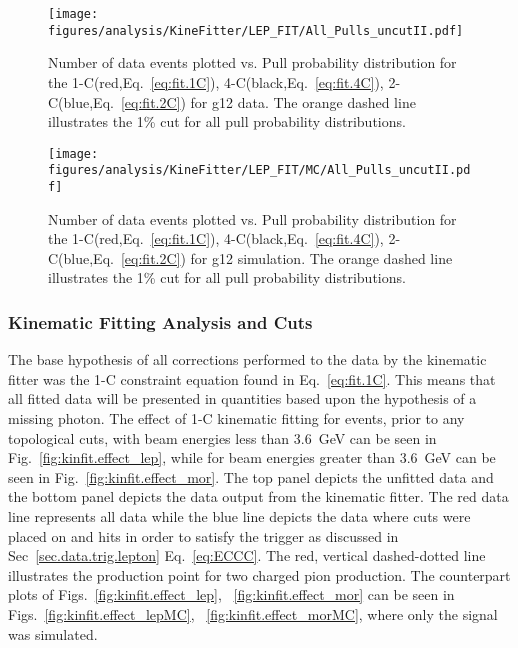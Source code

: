 \begin{figure}[h!]\begin{center}
\texttt{[image: \\figures/analysis/KineFitter/LEP\_FIT/All\_Pulls\_uncutII.pdf]}
\caption[Number of data events plotted vs. Pull distribution for the 1-C(red), 4-C(black), 2-C(blue) for g12 data]{\label{fig:kinfit.analysispulls}Number of data events plotted vs. Pull probability distribution for the 1-C(red,Eq.~\ref{eq:fit.1C}), 4-C(black,Eq.~\ref{eq:fit.4C}), 2-C(blue,Eq.~\ref{eq:fit.2C}) for g12 data. The orange dashed line illustrates the 1\% cut for all pull probability distributions.}
\end{center}\end{figure}

\begin{figure}[h!]\begin{center}
\texttt{[image: \\figures/analysis/KineFitter/LEP\_FIT/MC/All\_Pulls\_uncutII.pdf]}
\caption[Number of data events plotted vs. Pull distribution for the 1-C(red), 4-C(black), 2-C(blue) for g12 simulation]{\label{fig:kinfit.analysispulls_MC}Number of data events plotted vs. Pull probability distribution for the 1-C(red,Eq.~\ref{eq:fit.1C}), 4-C(black,Eq.~\ref{eq:fit.4C}), 2-C(blue,Eq.~\ref{eq:fit.2C}) for g12 simulation. The orange dashed line illustrates the 1\% cut for all pull probability distributions.}
\end{center}\end{figure}
\FloatBarrier
%
%
%
\subsubsection{Kinematic Fitting Analysis and Cuts}\label{sec:analysis.fitting.compare}

The base hypothesis of all corrections performed to the data by the kinematic fitter was the 1-C constraint equation found in Eq.~\ref{eq:fit.1C}. This means that all fitted data will be presented in quantities based upon the hypothesis of a missing photon. The effect of 1-C kinematic fitting for events, prior to any topological cuts, with beam energies less than 3.6~GeV can be seen in Fig.~\ref{fig:kinfit.effect_lep}, while for beam energies greater than 3.6~GeV can be seen in Fig.~\ref{fig:kinfit.effect_mor}. The top panel depicts the unfitted data and the bottom panel depicts the data output from the kinematic fitter. The red data line represents all data while the blue line depicts the data where cuts were placed on  and  hits in order to satisfy the trigger as discussed in Sec~\ref{sec.data.trig.lepton} Eq.~\ref{eq:ECCC}. The red, vertical dashed-dotted line illustrates the production point for two charged pion production. The  counterpart plots of Figs.~\ref{fig:kinfit.effect_lep}, ~\ref{fig:kinfit.effect_mor} can be seen in Figs.~\ref{fig:kinfit.effect_lepMC}, ~\ref{fig:kinfit.effect_morMC}, where only the \pizT signal was simulated.


